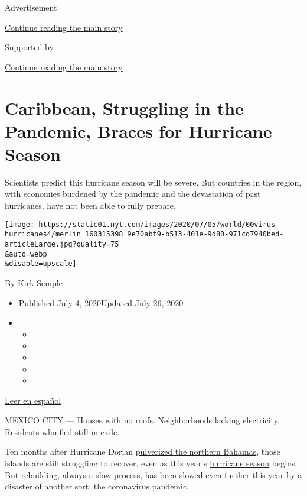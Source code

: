 Advertisement

\protect\hyperlink{after-top}{Continue reading the main story}

Supported by

\protect\hyperlink{after-sponsor}{Continue reading the main story}

\hypertarget{caribbean-struggling-in-the-pandemic-braces-for-hurricane-season}{%
\section{Caribbean, Struggling in the Pandemic, Braces for Hurricane
Season}\label{caribbean-struggling-in-the-pandemic-braces-for-hurricane-season}}

Scientists predict this hurricane season will be severe. But countries
in the region, with economies burdened by the pandemic and the
devastation of past hurricanes, have not been able to fully prepare.

\texttt{[image: https://static01.nyt.com/images/2020/07/05/world/00virus-hurricanes4/merlin\_160315398\_9e70abf9-b513-401e-9d80-971cd7940bed-articleLarge.jpg?quality=75\\\&auto=webp\\\&disable=upscale]}

By \href{https://www.nytimes.com/by/kirk-semple}{Kirk Semple}

\begin{itemize}
\item
  Published July 4, 2020Updated July 26, 2020
\item
  \begin{itemize}
  \item
  \item
  \item
  \item
  \item
  \end{itemize}
\end{itemize}

\href{https://www.nytimes.com/es/2020/07/08/espanol/america-latina/huracanes-caribe-coronavirus.html}{Leer
en español}

MEXICO CITY --- Houses with no roofs. Neighborhoods lacking electricity.
Residents who fled still in exile.

Ten months after Hurricane Dorian
\href{https://www.nytimes.com/2019/09/06/world/americas/hurricane-dorian-bahamas.html}{pulverized
the northern Bahamas}, those islands are still struggling to recover,
even as this year's
\href{https://www.nytimes.com/2020/07/26/us/hurricane-douglas-hawaii.html}{hurricane
season} begins. But rebuilding,
\href{https://www.nytimes.com/2019/10/07/world/americas/hurricane-irma-saint-martin.html}{always
a slow process}, has been slowed even further this year by a disaster of
another sort: the coronavirus pandemic.

